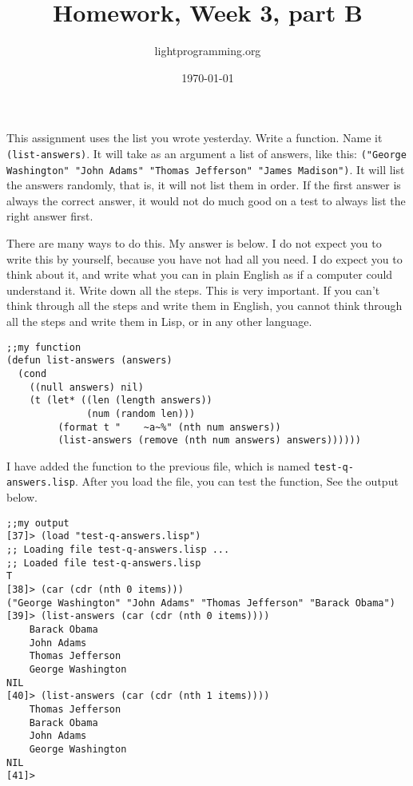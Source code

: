 \documentclass{article}
\title{Homework, Week 3, part B}
\author{lightprogramming.org}
\date{\today}
\begin{document}
\maketitle{}

This assignment uses the list you wrote yesterday. Write a function. Name it \texttt{(list-answers)}. It will take as an argument a list of answers, like this: \texttt{("George Washington" "John Adams" "Thomas Jefferson" "James Madison")}. It will list the answers randomly, that is, it will not list them in order. If the first answer is always the correct answer, it would not do much good on a test to always list the right answer first.

There are many ways to do this. My answer is below. I do not expect you to write this by yourself, because you have not had all you need. I do expect you to think about it, and write what you can in plain English as if a computer could understand it. Write down all the steps. This is very important. If you can't think through all the steps and write them in English, you cannot think through all the steps and write them in Lisp, or in any other language.

\lstset{language=Lisp,numbers=left,keepspaces=false,basicstyle=\small,numberstyle=\tiny,breaklines=true,showstringspaces=false}
\begin{lstlisting}[caption = My function]
;;my function
(defun list-answers (answers)
  (cond
    ((null answers) nil)
    (t (let* ((len (length answers))
              (num (random len)))
         (format t "    ~a~%" (nth num answers))
         (list-answers (remove (nth num answers) answers))))))
\end{lstlisting}

I have added the function to the previous file, which is named \texttt{test-q-answers.lisp}. After you load the file, you can test the function, See the output below.

\lstset{language=Lisp,numbers=left,keepspaces=false,basicstyle=\small,numberstyle=\tiny,breaklines=true,showstringspaces=false}
\begin{lstlisting}[caption = My output]
;;my output
[37]> (load "test-q-answers.lisp")
;; Loading file test-q-answers.lisp ...
;; Loaded file test-q-answers.lisp
T
[38]> (car (cdr (nth 0 items)))
("George Washington" "John Adams" "Thomas Jefferson" "Barack Obama")
[39]> (list-answers (car (cdr (nth 0 items))))
    Barack Obama
    John Adams
    Thomas Jefferson
    George Washington
NIL
[40]> (list-answers (car (cdr (nth 1 items))))
    Thomas Jefferson
    Barack Obama
    John Adams
    George Washington
NIL
[41]>
\end{lstlisting}
\end{document}
